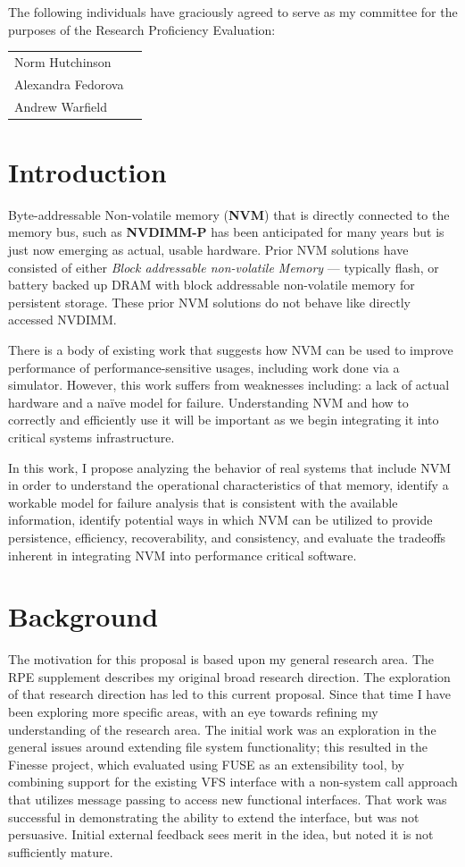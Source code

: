 \documentclass[letterpaper,twocolumn,10pt]{article}
\begin{document}
The following individuals have graciously agreed to serve as my committee for the purposes
of the Research Proficiency Evaluation:

\begin{tabular}{ll}
    Norm Hutchinson \\
    Alexandra Fedorova \\
    Andrew Warfield 
\end{tabular}

\section{Introduction}

Byte-addressable Non-volatile memory (\textbf{NVM}) that is directly connected to the memory bus, such as \textbf{NVDIMM-P} has been anticipated for many years but is just now emerging as actual, usable hardware.  Prior NVM solutions have consisted of either \textit{Block addressable non-volatile Memory} --- typically flash, or battery backed up DRAM with block addressable non-volatile memory for persistent storage.  These prior NVM solutions do not behave like directly accessed NVDIMM.

There is a body of existing work that suggests how NVM can be used to improve performance of performance-sensitive usages, including work done via a simulator.  However, this work suffers from weaknesses including: a lack of actual hardware and a na{\"i}ve model for failure.  Understanding NVM and how to correctly and efficiently use it will be important as we begin integrating it into critical systems infrastructure.

In this work, I propose analyzing the behavior of real systems that include NVM in order to understand the operational characteristics of that memory, identify a workable model for failure analysis that is consistent with the available information, identify potential ways in which NVM can be utilized to provide persistence, efficiency, recoverability, and consistency, and evaluate the tradeoffs inherent in integrating NVM into performance critical software.

\section{Background}

The motivation for this proposal is based upon my general research area.  The RPE supplement describes my original
broad research direction.  The exploration of that research direction has led to this current proposal. Since
that time I have been exploring more specific areas, with an eye towards refining my understanding of the research
area.  The initial work was an exploration in the general issues around extending file system functionality; this
resulted in the Finesse project, which evaluated using FUSE as an extensibility tool, by combining support for the
existing VFS interface with a non-system call approach that utilizes message passing to access new functional
interfaces.  That work was successful in demonstrating the ability to extend the interface, but was not persuasive.
Initial external feedback sees merit in the idea, but noted it is not sufficiently mature.
\end{document}
